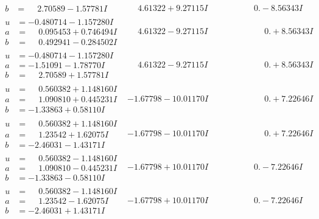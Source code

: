 \documentclass[1p]{elsarticle_modified}
\theoremstyle{definition}
\begin{document}
$$\begin{array}{c|c|c}
\begin{aligned}
b &= \phantom{-}2.70589 - 1.57781 I\end{aligned}
 & \phantom{-}4.61322 + 9.27115 I & \phantom{-0.000000 } 0. - 8.56343 I \\ \hline\begin{aligned}
u &= -0.480714 - 1.157280 I \\
a &= \phantom{-}0.095453 + 0.746494 I \\
b &= \phantom{-}0.492941 - 0.284502 I\end{aligned}
 & \phantom{-}4.61322 - 9.27115 I & \phantom{-0.000000 -}0. + 8.56343 I \\ \hline\begin{aligned}
u &= -0.480714 - 1.157280 I \\
a &= -1.51091 - 1.78770 I \\
b &= \phantom{-}2.70589 + 1.57781 I\end{aligned}
 & \phantom{-}4.61322 - 9.27115 I & \phantom{-0.000000 -}0. + 8.56343 I \\ \hline\begin{aligned}
u &= \phantom{-}0.560382 + 1.148160 I \\
a &= \phantom{-}1.090810 + 0.445231 I \\
b &= -1.33863 + 0.58110 I\end{aligned}
 & -1.67798 - 10.01170 I & \phantom{-0.000000 -}0. + 7.22646 I \\ \hline\begin{aligned}
u &= \phantom{-}0.560382 + 1.148160 I \\
a &= \phantom{-}1.23542 + 1.62075 I \\
b &= -2.46031 - 1.43171 I\end{aligned}
 & -1.67798 - 10.01170 I & \phantom{-0.000000 -}0. + 7.22646 I \\ \hline\begin{aligned}
u &= \phantom{-}0.560382 - 1.148160 I \\
a &= \phantom{-}1.090810 - 0.445231 I \\
b &= -1.33863 - 0.58110 I\end{aligned}
 & -1.67798 + 10.01170 I & \phantom{-0.000000 } 0. - 7.22646 I \\ \hline\begin{aligned}
u &= \phantom{-}0.560382 - 1.148160 I \\
a &= \phantom{-}1.23542 - 1.62075 I \\
b &= -2.46031 + 1.43171 I\end{aligned}
 & -1.67798 + 10.01170 I & \phantom{-0.000000 } 0. - 7.22646 I \\ \hline\begin{aligned}

\end{aligned}
\end{array}$$
\end{document}
